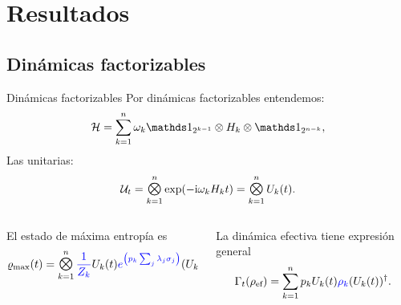 \section{Resultados}
\subsection{Dinámicas factorizables}
\begin{frame}{Dinámicas factorizables}
    Por dinámicas factorizables entendemos\pause:
    \begin{equation}
        \mcH=\sum_{k=1}^{n}\omega_{k}\Id_{2^{k-1}}\otimes H_{k} \otimes \Id_{2^{n-k}},\nonumber
    \end{equation}
    Las unitarias:\pause
    \begin{equation}
        \mcU_{t}=\Motimes_{k=1}^{n}\text{exp}\qty(-\rmi\omega_{k}H_{k}t)=\Motimes_{k=1}^{n} U_{k}(t).\nonumber
    \end{equation}\pause
    \begin{columns}
        \begin{column}{0.5\textwidth}
            El estado de máxima entropía es\pause
            \begin{equation}
                \varrho_{\max}(t)=\Motimes_{k=1}^{n}{\color{blue}\frac{1}{Z_{k}}}U_{k}(t) {\color{blue}e^{\qty(p_{k}\sum_{j}\lambda_{j}\pauli{j})}} (U_{k}(t))^{\dag}\nonumber
            \end{equation}
        \end{column}
        \pause
        \begin{column}{0.5\textwidth}
            La dinámica efectiva tiene expresión general\pause
            \begin{equation}
                \Gamma_{t}(\rho_{\text{ef}})=\sum_{k=1}^{n}p_{k} U_{k}(t) {\color{blue}\rho_{k}} (U_{k}(t))^{\dag}.\nonumber
            \end{equation}
        \end{column}
    \end{columns}
\end{frame}
